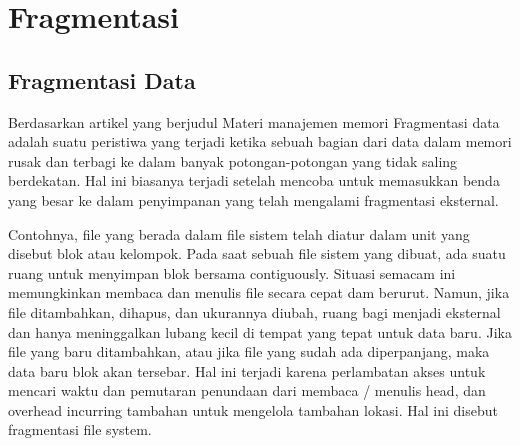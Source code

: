 \section{Fragmentasi}
\subsection{Fragmentasi Data}
	Berdasarkan artikel yang berjudul Materi manajemen memori \cite{tawarmateri} Fragmentasi data adalah suatu peristiwa  yang terjadi ketika sebuah bagian dari data dalam memori rusak dan terbagi ke dalam banyak potongan-potongan yang tidak saling berdekatan. Hal ini biasanya terjadi setelah mencoba untuk memasukkan benda yang besar ke dalam penyimpanan yang telah mengalami fragmentasi eksternal.
    
    Contohnya, file yang berada dalam file sistem telah diatur dalam unit yang disebut blok atau kelompok. Pada saat sebuah file sistem yang dibuat, ada suatu ruang untuk menyimpan blok bersama contiguously. Situasi semacam ini memungkinkan membaca dan menulis file secara cepat dam berurut. Namun, jika file ditambahkan, dihapus, dan ukurannya diubah, ruang bagi menjadi eksternal dan hanya meninggalkan lubang kecil di tempat yang tepat untuk data baru. Jika file yang baru ditambahkan, atau jika file yang sudah ada diperpanjang, maka data baru blok akan tersebar. Hal ini terjadi karena perlambatan akses untuk mencari waktu dan pemutaran penundaan dari membaca / menulis head, dan overhead incurring tambahan untuk mengelola tambahan lokasi. Hal ini disebut fragmentasi file system.
